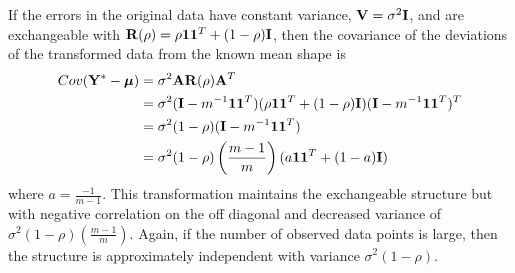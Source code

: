  If the errors in the original data have constant variance, $\mathbf V=\sigma^{2}\mathbf I$, and are exchangeable with $\mathbf R(\rho) = \rho\mathbf 1 \mathbf 1^{T} + (1-\rho)\mathbf I$, then the covariance of the deviations of the transformed data from the known mean shape is
 \begin{align*}
 Cov(\mathbf Y^{*}- \boldsymbol\mu) &= \sigma^{2}\mathbf A\mathbf R(\rho)\mathbf A^{T}\\
 &= \sigma^{2}(\mathbf I-m^{-1}\mathbf1\mathbf1^{T})(\rho\mathbf1\mathbf1^{T}+(1-\rho)\mathbf I)(\mathbf I-m^{-1}\mathbf1\mathbf1^{T})^{T}\\
 &= \sigma^{2}(1-\rho)(\mathbf I-m^{-1}\mathbf1\mathbf1^{T})\\
 &=\sigma^{2}(1-\rho)\left(\frac{m-1}{m}\right)(a\mathbf 1\mathbf 1^{T}+ (1-a)\mathbf I)
 \end{align*} 
 where $a=\frac{-1}{m-1}$. This transformation maintains the exchangeable structure but with negative correlation on the off diagonal and decreased variance of $\sigma^{2}(1-\rho)\left(\frac{m-1}{m}\right)$.  Again, if the number of observed data points is large, then the structure is approximately independent with variance $\sigma^{2}(1-\rho)$.

